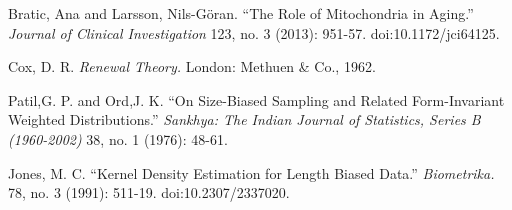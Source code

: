 \documentclass{article}\usepackage[]{graphicx}\usepackage[]{color}
\numberwithin{figure}{subsection} %
\numberwithin{table}{subsection} %
\begin{document}
\setcounter{section}{8}
\setcounter{page}{35}

\begin{thebibliography}{9}

Bratic, Ana and Larsson, Nils-Göran. 
``The Role of Mitochondria in Aging.''
\textit{Journal of Clinical Investigation}
123, no. 3 (2013): 951-57. doi:10.1172/jci64125.

Cox, D. R. 
\textit{Renewal Theory.}
London: Methuen \& Co., 1962.

Patil,G. P. and Ord,J. K.
``On Size-Biased Sampling and Related Form-Invariant Weighted Distributions.''
\textit{Sankhya: The Indian Journal of Statistics, Series B (1960-2002)} 
38, no. 1 (1976): 48-61. 

Jones, M. C.
``Kernel Density Estimation for Length Biased Data.''
\textit{Biometrika.}
78, no. 3 (1991): 511-19. doi:10.2307/2337020.


\end{thebibliography}
\end{document}
